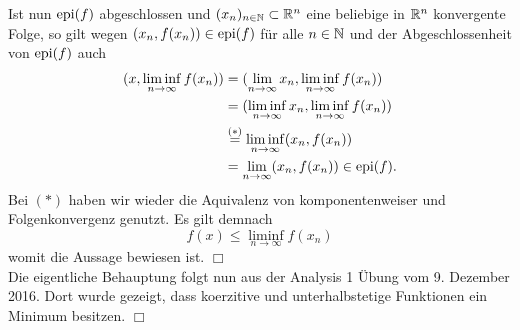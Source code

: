 \begin{itemize}
 \newpage

 Ist nun $\operatorname{epi}(f)$ abgeschlossen und $(x_n)_{n\in\mathbb{N}}\subset \mathbb{R}^n$ eine beliebige in $\mathbb{R}^n$ konvergente Folge, so gilt
 wegen $(x_n,f(x_n))\in\operatorname{epi}(f)$ für alle $n\in\mathbb{N}$ und der Abgeschlossenheit von $\operatorname{epi}(f) $ auch
 \begin{align*}
 (x,\liminf_{n\to\infty}f(x_n)) &= (\lim_{n\to\infty}x_n, \liminf_{n\to\infty}f(x_n)) \\
&= (\liminf_{n\to\infty} x_n, \liminf_{n\to\infty}f(x_n)) \\
&\overset{(*)}{=} \liminf_{n\to\infty}(x_n, f(x_n)) \\
&= \lim_{n\to\infty}(x_n, f(x_n)) \in \operatorname{epi}(f).
 \end{align*}
 Bei $(*)$ haben wir wieder die Aquivalenz von komponentenweiser und Folgenkonvergenz
 genutzt.
 Es gilt demnach
 \begin{displaymath}
  f(x)\leq \liminf_{n\to\infty}f(x_n)
 \end{displaymath}
 womit die Aussage bewiesen ist. \hfill$\Box$\\

 Die eigentliche Behauptung folgt nun aus der Analysis 1 Übung vom 9. Dezember 2016. Dort wurde gezeigt, dass koerzitive und unterhalbstetige Funktionen ein
 Minimum besitzen. \hfill$\Box$
\end{itemize}
